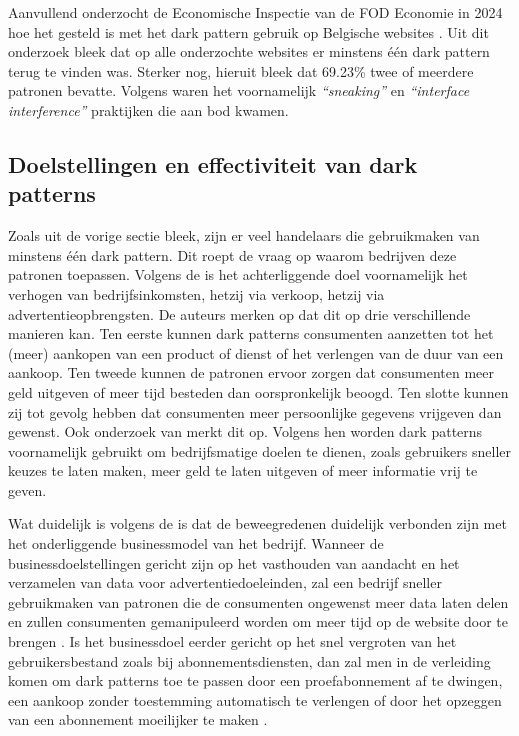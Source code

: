 Aanvullend onderzocht de Economische Inspectie van de FOD Economie in 2024 hoe het gesteld is met het dark pattern gebruik op Belgische websites \autocite{FODEconomie2024}. Uit dit onderzoek bleek dat op alle onderzochte websites er minstens één dark pattern terug te vinden was. Sterker nog, hieruit bleek dat 69.23\% twee of meerdere patronen bevatte. Volgens \textcite{FODEconomie2024} waren het voornamelijk \textit{“sneaking”} en \textit{“interface interference”} praktijken die aan bod kwamen.

\vspace{1em}

\subsection{Doelstellingen en effectiviteit van dark patterns}
\label{subsec:effectiviteit}

\vspace{1em}

Zoals uit de vorige sectie bleek, zijn er veel handelaars die gebruikmaken van minstens één dark pattern. Dit roept de vraag op waarom bedrijven deze patronen toepassen. Volgens de \textcite{OECD2022}  is het achterliggende doel voornamelijk het verhogen van bedrijfsinkomsten, hetzij via verkoop, hetzij via advertentieopbrengsten. De auteurs merken op dat dit op drie verschillende manieren kan. Ten eerste kunnen dark patterns consumenten aanzetten tot het (meer) aankopen van een product of dienst of het verlengen van de duur van een aankoop. Ten tweede kunnen de patronen ervoor zorgen dat consumenten meer geld uitgeven of meer tijd besteden dan oorspronkelijk beoogd. Ten slotte kunnen zij tot gevolg hebben dat consumenten meer persoonlijke gegevens vrijgeven dan gewenst. Ook onderzoek van \textcite{Kitkowska2023} merkt dit op. Volgens hen worden dark patterns voornamelijk gebruikt om bedrijfsmatige doelen te dienen, zoals gebruikers sneller keuzes te laten maken, meer geld te laten uitgeven of meer informatie vrij te geven.

\vspace{1em}

Wat duidelijk is volgens de \textcite{OECD2022} is dat de beweegredenen duidelijk verbonden zijn met het onderliggende businessmodel van het bedrijf. Wanneer de businessdoelstellingen gericht zijn op het vasthouden van aandacht en het verzamelen van data voor advertentiedoeleinden, zal een bedrijf sneller gebruikmaken van patronen die de consumenten ongewenst meer data laten delen en zullen consumenten gemanipuleerd worden om meer tijd op de website door te brengen \autocite{OECD2022}. Is het businessdoel eerder gericht op het snel vergroten van het gebruikersbestand zoals bij abonnementsdiensten, dan zal men in de verleiding komen om dark patterns toe te passen door een proefabonnement af te dwingen, een aankoop zonder toestemming automatisch te verlengen of door het opzeggen van een abonnement moeilijker te maken \autocite{OECD2022}.

